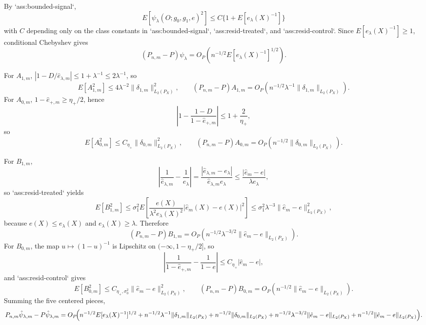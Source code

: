 \documentclass{article}
\begin{document}
By `ass:bounded-signal`,
\[
E[\psi_\lambda(O;g_0,g_1,e)^2]\le C\{1+E[e_\lambda(X)^{-1}]\}
\]
with $C$ depending only on the class constants in `ass:bounded-signal`, `ass:resid-treated`, and `ass:resid-control`. Since $E[e_\lambda(X)^{-1}]\ge 1$, conditional Chebyshev gives
\[
(P_{n,m}-P)\psi_\lambda
=O_P\!\left(n^{-1/2}E[e_\lambda(X)^{-1}]^{1/2}\right).
\]

For $A_{1,m}$, $|1-D/\hat e_{\lambda,m}|\le 1+\lambda^{-1}\le 2\lambda^{-1}$, so
\[
E[A_{1,m}^2]\le 4\lambda^{-2}\|\delta_{1,m}\|_{L_2(P_X)}^2,
\qquad
(P_{n,m}-P)A_{1,m}
=O_P\!\left(n^{-1/2}\lambda^{-1}\|\delta_{1,m}\|_{L_2(P_X)}\right).
\]
For $A_{0,m}$, $1-\hat e_{+,m}\ge \eta_+/2$, hence
\[
\left|1-\frac{1-D}{1-\hat e_{+,m}}\right|\le 1+\frac{2}{\eta_+},
\]
so
\[
E[A_{0,m}^2]\le C_{\eta_+}\|\delta_{0,m}\|_{L_2(P_X)}^2,
\qquad
(P_{n,m}-P)A_{0,m}
=O_P\!\left(n^{-1/2}\|\delta_{0,m}\|_{L_2(P_X)}\right).
\]

For $B_{1,m}$,
\[
\left|\frac1{\hat e_{\lambda,m}}-\frac1{e_\lambda}\right|
=\frac{|\hat e_{\lambda,m}-e_\lambda|}{\hat e_{\lambda,m}e_\lambda}
\le \frac{|\hat e_m-e|}{\lambda e_\lambda},
\]
so `ass:resid-treated` yields
\[
E[B_{1,m}^2]
\le \sigma_1^2 E\!\left[\frac{e(X)}{\lambda^2e_\lambda(X)^2}|\hat e_m(X)-e(X)|^2\right]
\le \sigma_1^2\lambda^{-3}\|\hat e_m-e\|_{L_2(P_X)}^2,
\]
because $e(X)\le e_\lambda(X)$ and $e_\lambda(X)\ge \lambda$. Therefore
\[
(P_{n,m}-P)B_{1,m}
=O_P\!\left(n^{-1/2}\lambda^{-3/2}\|\hat e_m-e\|_{L_2(P_X)}\right).
\]
For $B_{0,m}$, the map $u\mapsto (1-u)^{-1}$ is Lipschitz on $(-\infty,1-\eta_+/2]$, so
\[
\left|\frac1{1-\hat e_{+,m}}-\frac1{1-e}\right|
\le C_{\eta_+}|\hat e_m-e|,
\]
and `ass:resid-control` gives
\[
E[B_{0,m}^2]\le C_{\eta_+,\sigma_0^2}\|\hat e_m-e\|_{L_2(P_X)}^2,
\qquad
(P_{n,m}-P)B_{0,m}
=O_P\!\left(n^{-1/2}\|\hat e_m-e\|_{L_2(P_X)}\right).
\]
Summing the five centered pieces,
\[
P_{n,m}\hat\psi_{\lambda,m}-P\hat\psi_{\lambda,m}
=O_P\!\Bigl(
n^{-1/2}E[e_\lambda(X)^{-1}]^{1/2}
+n^{-1/2}\lambda^{-1}\|\delta_{1,m}\|_{L_2(P_X)}
+n^{-1/2}\|\delta_{0,m}\|_{L_2(P_X)}
+n^{-1/2}\lambda^{-3/2}\|\hat e_m-e\|_{L_2(P_X)}
+n^{-1/2}\|\hat e_m-e\|_{L_2(P_X)}
\Bigr).
\]
\end{document}
